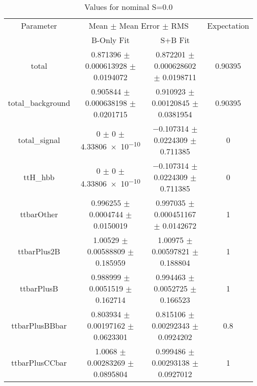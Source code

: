 \begin{table}
\centering
\caption{Values for nominal S=0.0}
\begin{tabular}{cccc}
\toprule
Parameter & \multicolumn{2}{c}{Mean $\pm$ Mean Error $\pm$ RMS} & Expectation\\
 & B-Only Fit & S+B Fit & \\
\midrule
total & \num{0.871396} $\pm$ \num{0.000613928} $\pm$ \num{0.0194072} & \num{0.872201} $\pm$ \num{0.000628602} $\pm$ \num{0.0198711} & \num{0.90395}\\
total\_background & \num{0.905844} $\pm$ \num{0.000638198} $\pm$ \num{0.0201715} & \num{0.910923} $\pm$ \num{0.00120845} $\pm$ \num{0.0381954} & \num{0.90395}\\
total\_signal & \num{0} $\pm$ \num{0} $\pm$ \num{4.33806e-10} & \num{-0.107314} $\pm$ \num{0.0224309} $\pm$ \num{0.711385} & \num{0}\\
ttH\_hbb & \num{0} $\pm$ \num{0} $\pm$ \num{4.33806e-10} & \num{-0.107314} $\pm$ \num{0.0224309} $\pm$ \num{0.711385} & \num{0}\\
ttbarOther & \num{0.996255} $\pm$ \num{0.0004744} $\pm$ \num{0.0150019} & \num{0.997035} $\pm$ \num{0.000451167} $\pm$ \num{0.0142672} & \num{1}\\
ttbarPlus2B & \num{1.00529} $\pm$ \num{0.00588809} $\pm$ \num{0.185959} & \num{1.00975} $\pm$ \num{0.00597821} $\pm$ \num{0.188804} & \num{1}\\
ttbarPlusB & \num{0.988999} $\pm$ \num{0.0051519} $\pm$ \num{0.162714} & \num{0.994463} $\pm$ \num{0.0052725} $\pm$ \num{0.166523} & \num{1}\\
ttbarPlusBBbar & \num{0.803934} $\pm$ \num{0.00197162} $\pm$ \num{0.0623301} & \num{0.815106} $\pm$ \num{0.00292343} $\pm$ \num{0.0924202} & \num{0.8}\\
ttbarPlusCCbar & \num{1.0068} $\pm$ \num{0.00283269} $\pm$ \num{0.0895804} & \num{0.999486} $\pm$ \num{0.00293138} $\pm$ \num{0.0927012} & \num{1}\\
\bottomrule
\end{tabular}
\end{table}